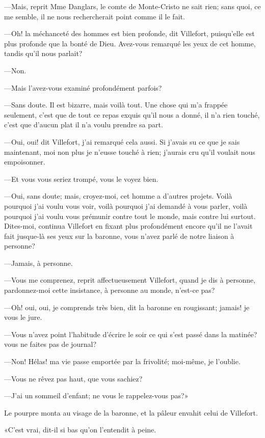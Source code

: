 —Mais, reprit Mme Danglars, le comte de Monte-Cristo ne sait rien; sans quoi, ce me semble, il ne nous rechercherait point comme il le fait. 

—Oh! la méchanceté des hommes est bien profonde, dit Villefort, puisqu'elle est plus profonde que la bonté de Dieu. Avez-vous remarqué les yeux de cet homme, tandis qu'il nous parlait? 

—Non. 

—Mais l'avez-vous examiné profondément parfois? 

—Sans doute. Il est bizarre, mais voilà tout. Une chose qui m'a frappée seulement, c'est que de tout ce repas exquis qu'il nous a donné, il n'a rien touché, c'est que d'aucun plat il n'a voulu prendre sa part. 

—Oui, oui! dit Villefort, j'ai remarqué cela aussi. Si j'avais su ce que je sais maintenant, moi non plus je n'eusse touché à rien; j'aurais cru qu'il voulait nous empoisonner. 

—Et vous vous seriez trompé, vous le voyez bien. 

—Oui, sans doute; mais, croyez-moi, cet homme a d'autres projets. Voilà pourquoi j'ai voulu vous voir, voilà pourquoi j'ai demandé à vous parler, voilà pourquoi j'ai voulu vous prémunir contre tout le monde, mais contre lui surtout. Dites-moi, continua Villefort en fixant plus profondément encore qu'il ne l'avait fait jusque-là ses yeux sur la baronne, vous n'avez parlé de notre liaison à personne? 

—Jamais, à personne. 

—Vous me comprenez, reprit affectueusement Villefort, quand je dis à personne, pardonnez-moi cette insistance, à personne au monde, n'est-ce pas? 

—Oh! oui, oui, je comprends très bien, dit la baronne en rougissant; jamais! je vous le jure. 

—Vous n'avez point l'habitude d'écrire le soir ce qui s'est passé dans la matinée? vous ne faites pas de journal? 

—Non! Hélas! ma vie passe emportée par la frivolité; moi-même, je l'oublie. 

—Vous ne rêvez pas haut, que vous sachiez? 

—J'ai un sommeil d'enfant; ne vous le rappelez-vous pas?» 

Le pourpre monta au visage de la baronne, et la pâleur envahit celui de Villefort. 

«C'est vrai, dit-il si bas qu'on l'entendit à peine. 

